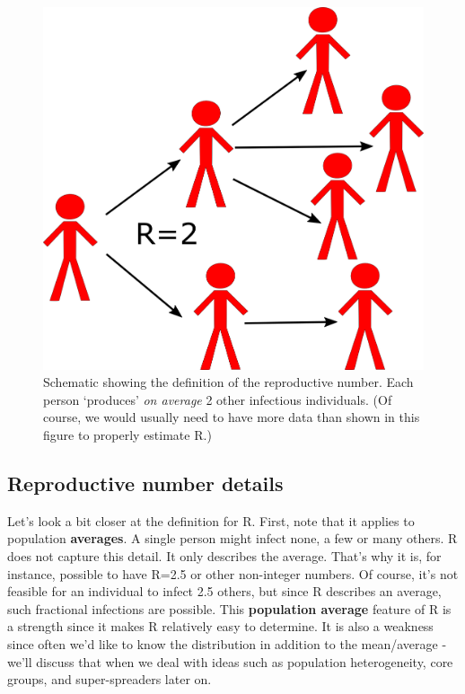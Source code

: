 \documentclass[]{article}
\theoremstyle{definition}
\theoremstyle{definition}
\theoremstyle{definition}
\theoremstyle{remark}
\begin{document}
\begin{figure}
\centering
\includegraphics{./images/R0scheme.png}
\caption{Schematic showing the definition of the reproductive number.
Each person `produces' \emph{on average} 2 other infectious individuals.
(Of course, we would usually need to have more data than shown in this
figure to properly estimate R.)}
\end{figure}

\subsection{Reproductive number
details}\label{reproductive-number-details}

Let's look a bit closer at the definition for R. First, note that it
applies to population \textbf{averages}. A single person might infect
none, a few or many others. R does not capture this detail. It only
describes the average. That's why it is, for instance, possible to have
R=2.5 or other non-integer numbers. Of course, it's not feasible for an
individual to infect 2.5 others, but since R describes an average, such
fractional infections are possible. This \textbf{population average}
feature of R is a strength since it makes R relatively easy to
determine. It is also a weakness since often we'd like to know the
distribution in addition to the mean/average - we'll discuss that when
we deal with ideas such as population heterogeneity, core groups, and
super-spreaders later on.
\end{document}
